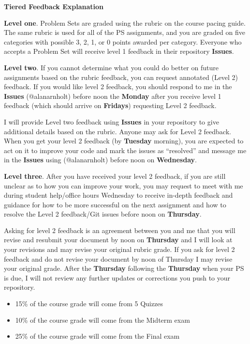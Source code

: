 \documentclass[
]{article}
\begin{document}
\begin{rmdnote}
\textbf{Tiered Feedback Explanation}

\textbf{Level one}. Problem Sets are graded using the rubric on the
course pacing guide. The same rubric is used for all of the PS
assignments, and you are graded on five categories with possible 3, 2,
1, or 0 points awarded per category. Everyone who accepts a Problem Set
will receive level 1 feedback in their repository \textbf{Issues}.

\textbf{Level two}. If you cannot determine what you could do better on
future assignments based on the rubric feedback, you can request
annotated (Level 2) feedback. If you would like level 2 feedback, you
should respond to me in the \textbf{Issues} (@alanarnholt) before noon
the \textbf{Monday} after you receive level 1 feedback (which should
arrive on \textbf{Fridays}) requesting Level 2 feedback.

I will provide Level two feedback using \textbf{Issues} in your
repository to give additional details based on the rubric. Anyone may
ask for Level 2 feedback. When you get your level 2 feedback (by
\textbf{Tuesday} morning), you are expected to act on it to improve your
code and mark the issues as ``resolved'' and message me in the
\textbf{Issues} using (@alanarnholt) before noon on \textbf{Wednesday}.

\textbf{Level three}. After you have received your level 2 feedback, if
you are still unclear as to how you can improve your work, you may
request to meet with me during student help/office hours Wednesday to
receive in-depth feedback and guidance for how to be more successful on
the next assignment and how to resolve the Level 2 feedback/Git issues
before noon on \textbf{Thursday}.

Asking for level 2 feedback is an agreement between you and me that you
will revise and resubmit your document by noon on \textbf{Thursday} and
I will look at your revisions and may revise your original rubric grade.
If you ask for level 2 feedback and do not revise your document by noon
of Thursday I may revise your original grade. After the
\textbf{Thursday} following the \textbf{Thursday} when your PS is due, I
will not review any further updates or corrections you push to your
repository.
\end{rmdnote}

\begin{itemize}
\item
  15\% of the course grade will come from 5 Quizzes
\item
  10\% of the course grade will come from the Midterm exam
\item
  25\% of the course grade will come from the Final exam
\end{itemize}
\end{document}
